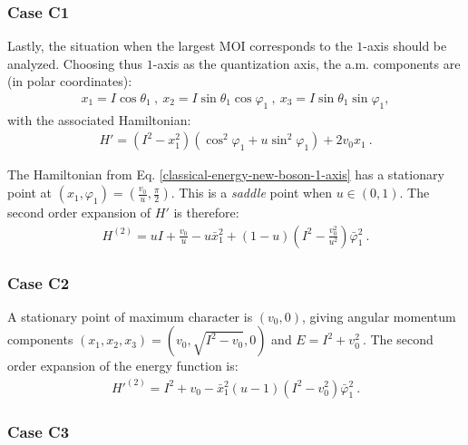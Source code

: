 \subsubsection*{Case C1}

Lastly, the situation when the largest MOI corresponds to the $1$-axis should be analyzed. Choosing thus $1$-axis as the quantization axis, the a.m. components are (in polar coordinates):
\begin{align}
    x_1=I\cos\theta_1\ ,\ x_2=I\sin\theta_1\cos\varphi_1\ ,\ x_3=I\sin\theta_1\sin\varphi_1,
    \label{polar-coordinates-case-c1}
\end{align}
with the associated Hamiltonian:
\begin{align}
    H'=\left(I^2-x_1^2\right)\left(\cos^2\varphi_1+u\sin^2\varphi_1\right)+2v_0x_1\ .
    \label{classical-energy-new-boson-1-axis}
\end{align}

The Hamiltonian from Eq. \ref{classical-energy-new-boson-1-axis} has a stationary point at $(x_1,\varphi_1)=\left(\frac{v_0}{u},\frac{\pi}{2}\right)$. This is a \emph{saddle} point when $u\in(0,1)$. The second order expansion of $H'$ is therefore:
\begin{align}
    H^{(2)}=uI+\frac{v_0}{u}-u\bar{x}_1^2+(1-u)\left(I^2-\frac{v_0^2}{u^2}\right)\bar{\varphi}_1^2\ .
\end{align}



\subsubsection*{Case C2}

A stationary point of maximum character is $(v_0,0)$, giving angular momentum components $(x_1,x_2,x_3)=(v_0,\sqrt{I^2-v_0},0)$ and $E=I^2+v_0^2\ .$ The second order expansion of the energy function is:
\begin{align}
    H'^{(2)}=I^2+v_0-\bar{x}_1^2(u-1)\left(I^2-v_0^2\right)\bar{\varphi}_1^2\ .
\end{align}

\subsubsection*{Case C3}